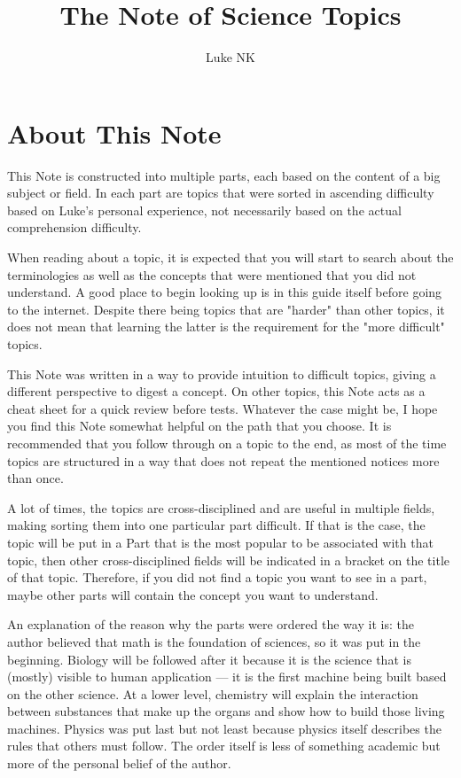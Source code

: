 \documentclass{report}
\title{The Note of Science Topics}
\author{Luke NK}
\begin{document}
\sffamily

\maketitle
\tableofcontents

\chapter*{About This Note}
This Note is constructed into multiple parts, each based on the content of a big subject or field. In each part are topics that were sorted in ascending difficulty based on Luke's personal experience, not necessarily based on the actual comprehension difficulty.

When reading about a topic, it is expected that you will start to search about the terminologies as well as the concepts that were mentioned that you did not understand. A good place to begin looking up is in this guide itself before going to the internet. Despite there being topics that are "harder" than other topics, it does not mean that learning the latter is the requirement for the "more difficult" topics.

This Note was written in a way to provide intuition to difficult topics, giving a different perspective to digest a concept. On other topics, this Note acts as a cheat sheet for a quick review before tests. Whatever the case might be, I hope you find this Note somewhat helpful on the path that you choose. It is recommended that you follow through on a topic to the end, as most of the time topics are structured in a way that does not repeat the mentioned notices more than once.

A lot of times, the topics are cross-disciplined and are useful in multiple fields, making sorting them into one particular part difficult. If that is the case, the topic will be put in a Part that is the most popular to be associated with that topic, then other cross-disciplined fields will be indicated in a bracket on the title of that topic. Therefore, if you did not find a topic you want to see in a part, maybe other parts will contain the concept you want to understand.

An explanation of the reason why the parts were ordered the way it is: the author believed that math is the foundation of sciences, so it was put in the beginning. Biology will be followed after it because it is the science that is (mostly) visible to human application — it is the first machine being built based on the other science. At a lower level, chemistry will explain the interaction between substances that make up the organs and show how to build those living machines. Physics was put last but not least because physics itself describes the rules that others must follow. The order itself is less of something academic but more of the personal belief of the author.
\end{document}
